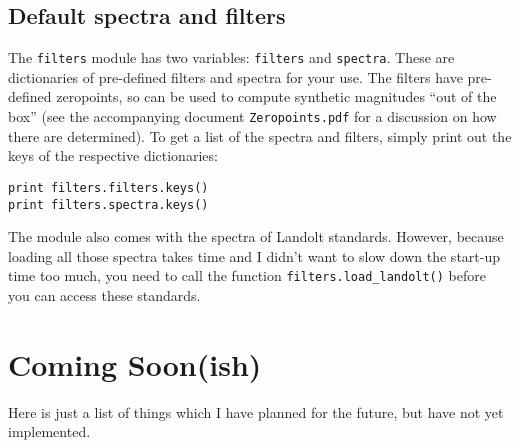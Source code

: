 \documentclass[12pt]{article}
\begin{document}
\subsection{Default spectra and filters\label{sub:default_filters}}

The \texttt{filters} module has two variables: \texttt{filters} and
\texttt{spectra}. These are dictionaries of pre-defined filters and
spectra for your use. The filters have pre-defined zeropoints, so
can be used to compute synthetic magnitudes {}``out of the box''
(see the accompanying document \texttt{Zeropoints.pdf} for a discussion
on how there are determined). To get a list of the spectra and filters,
simply print out the keys of the respective dictionaries:

\begin{verbatim}
print filters.filters.keys()
print filters.spectra.keys()
\end{verbatim}

The module also comes with the spectra of Landolt standards. However,
because loading all those spectra takes time and I didn't want to
slow down the start-up time too much, you need to call the function
\texttt{filters.load\_landolt()} before you can access these standards.


\section{Coming Soon(ish)}

Here is just a list of things which I have planned for the future,
but have not yet implemented.
\end{document}
